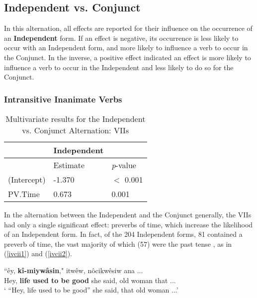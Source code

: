 \subsection{Independent vs. Conjunct}
In this alternation, all effects are reported for their influence on the occurrence of an \textbf{Independent} form. If an effect is negative, its occurrence is less likely to occur with an Independent form, and more likely to influence a verb to occur in the Conjunct. In the inverse, a positive effect indicated an effect is more likely to influence a verb to occur in the Independent and less likely to do so for the Conjunct.

    \subsubsection{Intransitive Inanimate Verbs}
    \begin{table}[H]
    \centering
    \begin{tabular}{lll}
    \toprule
            & \textbf{Independent} & \\
                    \midrule
            & Estimate & \textit{p}-value \\
    \midrule
(Intercept) & -1.370 & $<$ 0.001 \\
PV.Time & 0.673 & 0.001 \\

    \bottomrule
    \end{tabular}
    \caption{
       Multivariate results for the Independent vs. Conjunct Alternation: VIIs \\ \label{tab:iiivcmv}
      }
    \end{table}
    


    In the alternation between the Independent and the Conjunct generally, the VIIs had only a single significant effect: preverbs of time, which increase the likelihood of an Independent form. In fact, of the 204 Independent forms, 81 contained a preverb of time, the vast majority of which (57) were the past tense , as in (\ref{ivcii1}) and (\ref{ivcii2}). 
    
    \begin{exe}
    \ex
    \gll ``êy, \textbf{kî-miywâsin}," itwêw, nôcikwêsiw ana ...\\
           Hey, {\textbf{life used to be good}} {she said}, {old woman} that ... \\
    \trans ` ``Hey, life used to be good'' she said, that old woman ...' \citep[74]{Bearetal1992}
    \label{ivcii1}
    \end{exe}
    
